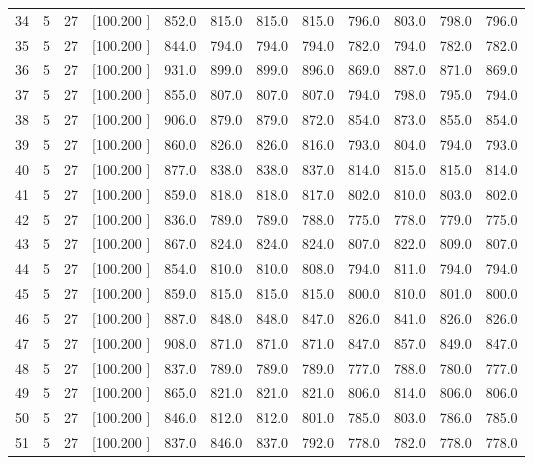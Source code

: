 \documentclass[12pt,a4paper]{article}
\begin{document}
\begin{center}
{\begin{tabular}{r r r r r r r r r r r r}
  34&  5& 27&[100.200   ]&   852.0&   815.0&   815.0&   815.0&   796.0&   803.0&   798.0&   796.0\\[-0.02in]
  35&  5& 27&[100.200   ]&   844.0&   794.0&   794.0&   794.0&   782.0&   794.0&   782.0&   782.0\\[-0.02in]
  36&  5& 27&[100.200   ]&   931.0&   899.0&   899.0&   896.0&   869.0&   887.0&   871.0&   869.0\\[-0.02in]
  37&  5& 27&[100.200   ]&   855.0&   807.0&   807.0&   807.0&   794.0&   798.0&   795.0&   794.0\\[-0.02in]
  38&  5& 27&[100.200   ]&   906.0&   879.0&   879.0&   872.0&   854.0&   873.0&   855.0&   854.0\\[-0.02in]
  39&  5& 27&[100.200   ]&   860.0&   826.0&   826.0&   816.0&   793.0&   804.0&   794.0&   793.0\\[-0.02in]
  40&  5& 27&[100.200   ]&   877.0&   838.0&   838.0&   837.0&   814.0&   815.0&   815.0&   814.0\\[-0.02in]
  41&  5& 27&[100.200   ]&   859.0&   818.0&   818.0&   817.0&   802.0&   810.0&   803.0&   802.0\\[-0.02in]
  42&  5& 27&[100.200   ]&   836.0&   789.0&   789.0&   788.0&   775.0&   778.0&   779.0&   775.0\\[-0.02in]
  43&  5& 27&[100.200   ]&   867.0&   824.0&   824.0&   824.0&   807.0&   822.0&   809.0&   807.0\\[-0.02in]
  44&  5& 27&[100.200   ]&   854.0&   810.0&   810.0&   808.0&   794.0&   811.0&   794.0&   794.0\\[-0.02in]
  45&  5& 27&[100.200   ]&   859.0&   815.0&   815.0&   815.0&   800.0&   810.0&   801.0&   800.0\\[-0.02in]
  46&  5& 27&[100.200   ]&   887.0&   848.0&   848.0&   847.0&   826.0&   841.0&   826.0&   826.0\\[-0.02in]
  47&  5& 27&[100.200   ]&   908.0&   871.0&   871.0&   871.0&   847.0&   857.0&   849.0&   847.0\\[-0.02in]
  48&  5& 27&[100.200   ]&   837.0&   789.0&   789.0&   789.0&   777.0&   788.0&   780.0&   777.0\\[-0.02in]
  49&  5& 27&[100.200   ]&   865.0&   821.0&   821.0&   821.0&   806.0&   814.0&   806.0&   806.0\\[-0.02in]
  50&  5& 27&[100.200   ]&   846.0&   812.0&   812.0&   801.0&   785.0&   803.0&   786.0&   785.0\\[-0.02in]
  51&  5& 27&[100.200   ]&   837.0&   846.0&   837.0&   792.0&   778.0&   782.0&   778.0&   778.0\\[-0.02in]

\end{tabular}}
\end{center}
\end{document}
